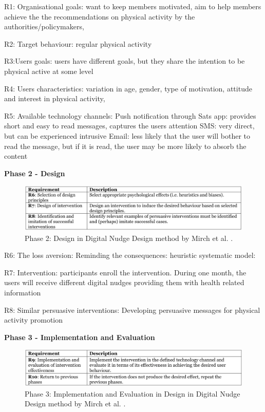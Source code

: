 R1: Organisational goals: want to keep members motivated, aim to help members achieve the the recommendations on physical activity by the authorities/policymakers, 

R2: Target behaviour: regular physical activity 

R3:Users goals: users have different goals, but they share the intention to be physical active at some level 

R4: Users characteristics: variation in age, gender, type of motivation, attitude and interest in physical activity,

R5: Available technology channels: 
Push notification through Sats app: provides short and easy to read messages, captures the users attention
SMS: very direct, but can be experienced intrusive 
Email: less likely that the user will bother to read the message, but if it is read, the user may be more likely to absorb the content

\textbf{Phase 2 - Design }
\begin{figure}[h]
\includegraphics[width=1\textwidth]{images/Phase2.png}
\caption{Phase 2: Design in Digital Nudge Design method by Mirch et al. \cite{mirsch_making_2018}.}
\end{figure}
\bigbreak
R6: The loss aversion: 
Reminding the consequences: 
heuristic systematic model: 

R7: Intervention: participants enroll the intervention. During one month, the users will receive different digital nudges providing them with health related information 

R8: Similar persuasive interventions: Developing persuasive messages for physical activity promotion
 
\textbf{Phase 3 - Implementation and Evaluation }
\bigbreak
\begin{figure}[ht]
\includegraphics[width=1\textwidth]{images/Phase3.png}
\caption{Phase 3: Implementation and Evaluation in Design in Digital Nudge Design method by Mirch et al. \cite{mirsch_making_2018}. }
\end{figure}
\bigbreak
\bigbreak

